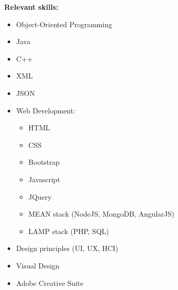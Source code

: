 \documentclass[12pt,a4paper]{article}
\begin{document}
		\parbox{\textwidth}{
			\textbf{\small Relevant skills:}
			\begin{itemize}\itemsep0em
				\item Object-Oriented Programming
				\item Java
				\item C++
				\item XML
				\item JSON
				\item Web Development:
				\begin{itemize}\itemsep0em
					\item HTML
					\item CSS
					\item Bootstrap
					\item Javascript
					\item JQuery
					\item MEAN stack (NodeJS, MongoDB, AngularJS)
					\item LAMP stack (PHP, SQL)
				\end{itemize}
				\item Design principles (UI, UX, HCI)
				\item Visual Design
				\item Adobe Creative Suite

			\end{itemize}
		}
\end{document}
